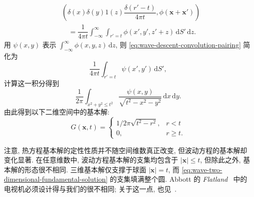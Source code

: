 \begin{equation}\label{eq:wave-descent-convolution-pairing}
\begin{aligned}
&\left(\delta(x)\delta(y)1(z)\dfrac{\delta(r'-t)}{4\pi t},\phi(\bm{x}+\bm{x}')\right)\\
&\quad=\dfrac1{4\pi t}\int_{-\infty}^\infty\int_{r'=t}\phi(x',y',z'+z)\,\mathrm{d}S'\,\mathrm{d}z.
\end{aligned}
\end{equation}
用 $\psi(x,y)$ 表示 $\int_{-\infty}^\infty\phi(x,y,z)\,\mathrm{d}z$, 则 \eqref{eq:wave-descent-convolution-pairing} 简化为
\begin{equation}\label{eq:wave-descent-surface-pairing}
\dfrac1{4\pi t}\int_{r'=t}\psi(x',y')\,\mathrm{d}S',
\end{equation}
计算这一积分得到
\begin{equation}\label{eq:wave-descent-disk-pairing}
\dfrac1{2\pi}\int_{x^2+y^2\leq t^2}\dfrac{\psi(x,y)}{\sqrt{t^2-x^2-y^2}}\,\mathrm{d}x\,\mathrm{d}y.
\end{equation}
由此得到以下二维空间中的基本解:
\begin{equation}\label{eq:wave-two-dimensional-fundamental-solution}
G(\bm{x},t)=\begin{cases}1/2\pi\sqrt{t^2-r^2},&r<t\\0,&r\geq t.\end{cases}
\end{equation}


注意, 热方程基本解的定性性质并不随空间维数真正改变, 但波动方程的基本解却变化显著. 在任意维数中, 波动方程基本解的支集均包含于 $|\bm{x}|\leq t$, 但除此之外, 基本解的形态很不相同. 三维基本解仅支撑于球面 $|\bm{x}|=t$, 而 \eqref{eq:wave-two-dimensional-fundamental-solution} 的支集填满整个圆. Abbott 的 \emph{Flatland}~\cite{Ab} 中的电视机必须设计得与我们的很不相同; 关于这一点, 也见~\cite{Mo}.
